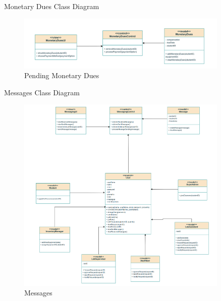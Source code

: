 \documentclass[20pt]{beamer}
\numberwithin{figure}{section}
\begin{document}
\begin{frame}{Monetary Dues Class Diagram}

     \begin{figure}
        \centering
        \includegraphics[width= 0.9\textwidth , height= 0.4\paperheight]{MonetaryDuesUML.png}
        \caption{{Pending Monetary Dues}}
        \label{fig:13}
    \end{figure}

\end{frame}

\begin{frame}{Messages Class Diagram}

     \begin{figure}
        \centering
        \includegraphics[width= 0.9\textwidth , height= 0.8\paperheight]{MessagesUML.png}
        \caption{Messages}
        \label{fig:14}
    \end{figure}

\end{frame}
\end{document}
